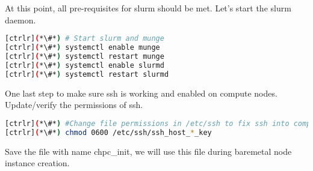 	At this point, all pre-requisites for slurm should be met. Let's start the slurm daemon.


\begin{lstlisting}[language=bash,keywords={}]
[ctrlr](*\#*) # Start slurm and munge 
[ctrlr](*\#*) systemctl enable munge
[ctrlr](*\#*) systemctl restart munge
[ctrlr](*\#*) systemctl enable slurmd
[ctrlr](*\#*) systemctl restart slurmd
\end{lstlisting}

	One last step to make sure ssh is working and enabled on compute nodes. Update/verify the permissions of ssh.


\begin{lstlisting}[language=bash,keywords={}]
[ctrlr](*\#*) #Change file permissions in /etc/ssh to fix ssh into compute node
[ctrlr](*\#*) chmod 0600 /etc/ssh/ssh_host_*_key
\end{lstlisting}

	Save the file with name chpc\_init, we will use this file during baremetal node instance creation.

